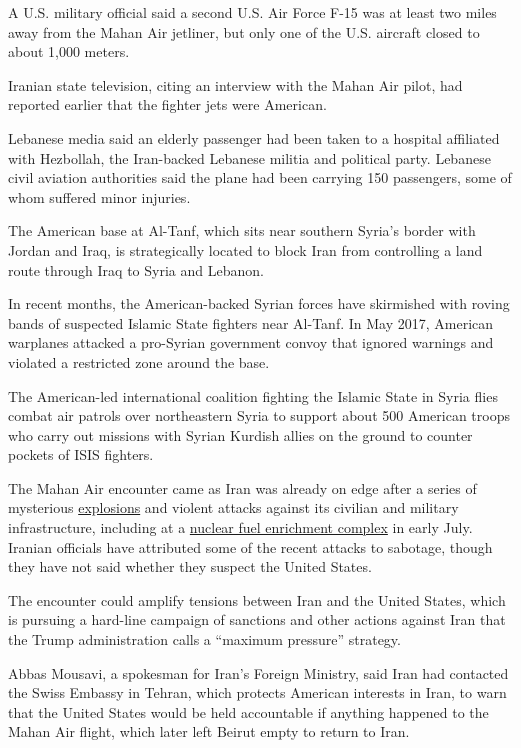 A U.S. military official said a second U.S. Air Force F-15 was at least
two miles away from the Mahan Air jetliner, but only one of the U.S.
aircraft closed to about 1,000 meters.

Iranian state television, citing an interview with the Mahan Air pilot,
had reported earlier that the fighter jets were American.

Lebanese media said an elderly passenger had been taken to a hospital
affiliated with Hezbollah, the Iran-backed Lebanese militia and
political party. Lebanese civil aviation authorities said the plane had
been carrying 150 passengers, some of whom suffered minor injuries.

The American base at Al-Tanf, which sits near southern Syria's border
with Jordan and Iraq, is strategically located to block Iran from
controlling a land route through Iraq to Syria and Lebanon.

In recent months, the American-backed Syrian forces have skirmished with
roving bands of suspected Islamic State fighters near Al-Tanf. In May
2017, American warplanes attacked a pro-Syrian government convoy that
ignored warnings and violated a restricted zone around the base.

The American-led international coalition fighting the Islamic State in
Syria flies combat air patrols over northeastern Syria to support about
500 American troops who carry out missions with Syrian Kurdish allies on
the ground to counter pockets of ISIS fighters.

The Mahan Air encounter came as Iran was already on edge after a series
of mysterious
\href{https://www.nytimes.com/2020/07/15/world/middleeast/iran-ships-fire-explosions.html}{explosions}
and violent attacks against its civilian and military infrastructure,
including at a
\href{https://www.nytimes.com/2020/07/05/world/middleeast/iran-Natanz-nuclear-damage.html}{nuclear
fuel enrichment complex} in early July. Iranian officials have
attributed some of the recent attacks to sabotage, though they have not
said whether they suspect the United States.

The encounter could amplify tensions between Iran and the United States,
which is pursuing a hard-line campaign of sanctions and other actions
against Iran that the Trump administration calls a ``maximum pressure''
strategy.

Abbas Mousavi, a spokesman for Iran's Foreign Ministry, said Iran had
contacted the Swiss Embassy in Tehran, which protects American interests
in Iran, to warn that the United States would be held accountable if
anything happened to the Mahan Air flight, which later left Beirut empty
to return to Iran.

